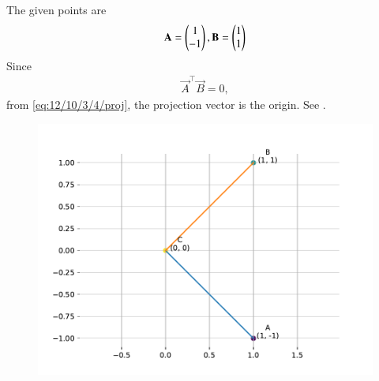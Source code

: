 The given points are
\begin{align}
 \mathbf{A}=\begin{pmatrix}1\\ -1\end{pmatrix},
 \mathbf{B}=\begin{pmatrix}1\\ 1\end{pmatrix}
\end{align}
Since
\begin{align}
	\vec{A}^\top \vec{B} =0,
\end{align}
	from \eqref{eq:12/10/3/4/proj},
the projection vector is the origin.
		See .
\begin{figure}[H]
	\centering
\includegraphics[width=0.75\columnwidth]{chapters/12/10/3/3/figs/fig.pdf}
\caption{}
		\label{fig:12/10/3/3fig}
\end{figure}
